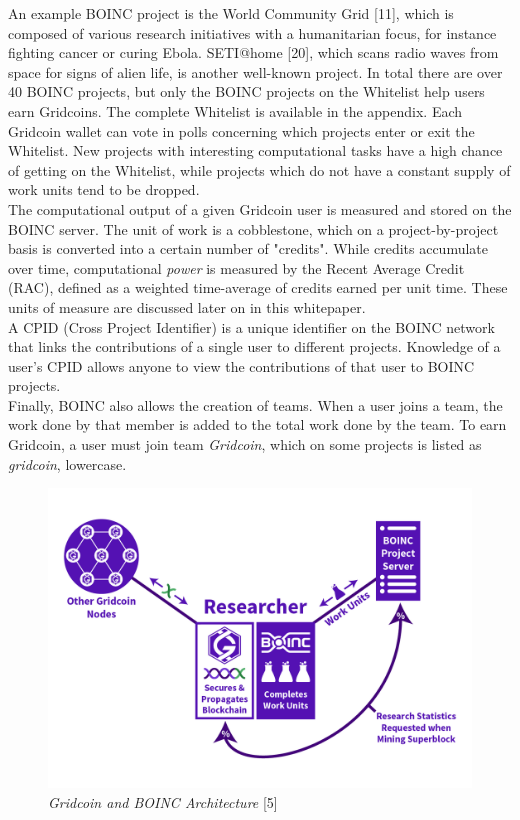 An example BOINC project is the World Community Grid [11], which is composed of various research initiatives with a humanitarian focus, for instance fighting cancer or curing Ebola. SETI@home [20], which scans radio waves from space for signs of alien life, is another well-known project.  In total there are over 40 BOINC projects, but only the BOINC projects on the Whitelist help users earn Gridcoins. The complete Whitelist is available in the appendix. Each Gridcoin wallet can vote in polls concerning which projects enter or exit the Whitelist. New projects with interesting computational tasks have a high chance of getting on the Whitelist, while projects which do not have a constant supply of work units tend to be dropped. \\

The computational output of a given Gridcoin user is measured and stored on the BOINC server. The unit of work is a cobblestone, which on a project-by-project basis is converted into a certain number of "credits".  While credits accumulate over time, computational \textit{power} is measured by the Recent Average Credit (RAC), defined as a weighted time-average of credits earned per unit time. These units of measure are discussed later on in this whitepaper.\\

A CPID (Cross Project Identifier) is a unique identifier on the BOINC network that links the contributions of a single user to different projects. Knowledge of a user's CPID allows anyone to view the contributions of that user to BOINC projects.\\

Finally, BOINC also allows the creation of teams. When a user joins a team, the work done by that member is added to the total work done by the team. To earn Gridcoin, a user must join team \textit{Gridcoin}, which on some projects is listed as \textit{gridcoin}, lowercase.

\begin{figure}
\centering
\includegraphics[scale=0.5]{figures/researcherdiagram_joshoeah}
\medskip
\caption{\textit{Gridcoin and BOINC Architecture} [5]}
\small
\end{figure}

